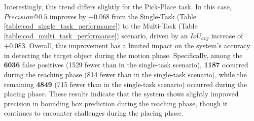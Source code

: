 Interestingly, this trend differs slightly for the Pick-Place task. In this case, $Precision@0.5$ improves by $+0.068$ from the Single-Task (Table \ref{table:cod_single_task_performance}) to the Multi-Task (Table \ref{table:cod_multi_task_performance}) scenario, driven by an $IoU_{avg}$ increase of $+0.083$. Overall, this improvement has a limited impact on the system's accuracy in detecting the target object during the motion phase. Specifically, among the \textbf{6036} false positives (1529 fewer than in the single-task scenario), \textbf{1187} occurred during the reaching phase (814 fewer than in the single-task scenario), while the remaining \textbf{4849} (715 fewer than in the single-task scenario) occurred during the placing phase. These results indicate that the system shows slightly improved precision in bounding box prediction during the reaching phase, though it continues to encounter challenges during the placing phase.





